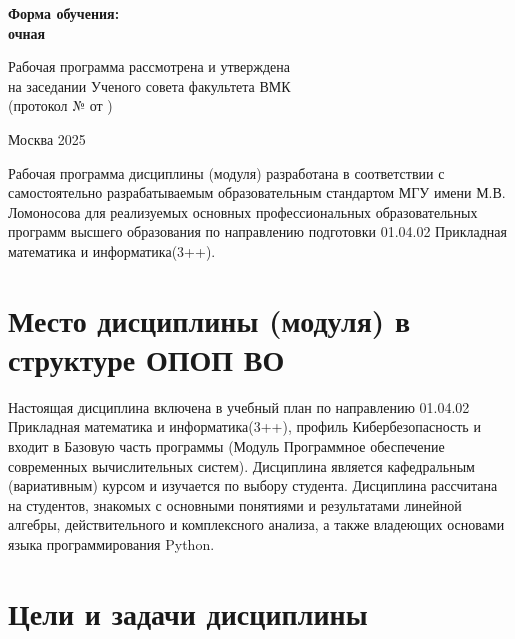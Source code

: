 \documentclass[a4paper, 12pt]{article}
\begin{document}
\begin{titlepage}
    \vspace{16pt}

    \textbf{Форма обучения:\\
    очная}

    \vspace{48pt}

    \begin{flushright}

        Рабочая программа рассмотрена и утверждена\\
        на заседании  Ученого совета факультета ВМК\\
        (протокол №\underline{\hspace{0.5cm}} от \underline{\hspace{3cm}})

    \end{flushright}

\vspace*{\fill}

Москва 2025

\end{titlepage}

Рабочая программа дисциплины (модуля) разработана в соответствии с самостоятельно разрабатываемым образовательным стандартом МГУ имени М.В. Ломоносова для реализуемых основных профессиональных образовательных программ высшего образования по направлению подготовки 01.04.02 \flqq Прикладная математика и информатика\frqq (3++).

\newpage \tableofcontents

\newpage

\section{Место дисциплины (модуля) в структуре ОПОП ВО}

Настоящая дисциплина включена в учебный план по направлению 01.04.02 \flqq Прикладная математика и информатика\frqq (3++), профиль Кибербезопасность и входит в Базовую часть программы (Модуль \flqq Программное обеспечение современных вычислительных систем\frqq).
Дисциплина является кафедральным (вариативным)  курсом и изучается по выбору студента.
Дисциплина рассчитана на студентов, знакомых с основными понятиями и результатами линейной алгебры, действительного и комплексного анализа, а также владеющих основами языка программирования Python.

\section{Цели и задачи дисциплины}
\end{document}
